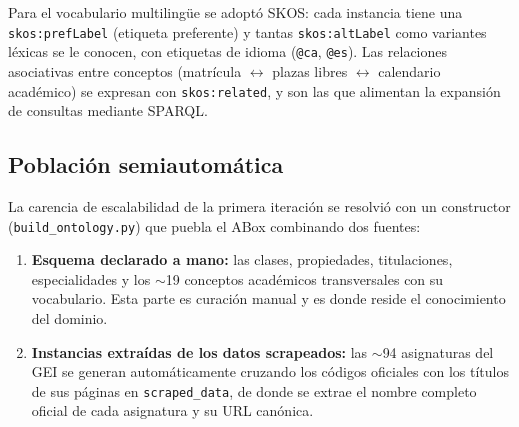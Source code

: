\documentclass[12pt, a4paper, twoside]{report}
\begin{document}
Para el vocabulario multiling\"ue se adopt\'o SKOS: cada instancia tiene una \texttt{skos:prefLabel} (etiqueta preferente) y tantas \texttt{skos:altLabel} como variantes l\'exicas se le conocen, con etiquetas de idioma (\texttt{@ca}, \texttt{@es}). Las relaciones asociativas entre conceptos (matr\'icula $\leftrightarrow$ plazas libres $\leftrightarrow$ calendario acad\'emico) se expresan con \texttt{skos:related}, y son las que alimentan la expansi\'on de consultas mediante SPARQL.

\subsection{Poblaci\'on semiautom\'atica}

La carencia de escalabilidad de la primera iteraci\'on se resolvi\'o con un constructor (\texttt{build\_ontology.py}) que puebla el ABox combinando dos fuentes:

\begin{enumerate}
  \item \textbf{Esquema declarado a mano:} las clases, propiedades, titulaciones, especialidades y los $\sim$19 conceptos acad\'emicos transversales con su vocabulario. Esta parte es curaci\'on manual y es donde reside el conocimiento del dominio.
  \item \textbf{Instancias extra\'idas de los datos scrapeados:} las $\sim$94 asignaturas del GEI se generan autom\'aticamente cruzando los c\'odigos oficiales con los t\'itulos de sus p\'aginas en \texttt{scraped\_data}, de donde se extrae el nombre completo oficial de cada asignatura y su URL can\'onica.
\end{enumerate}
\end{document}
